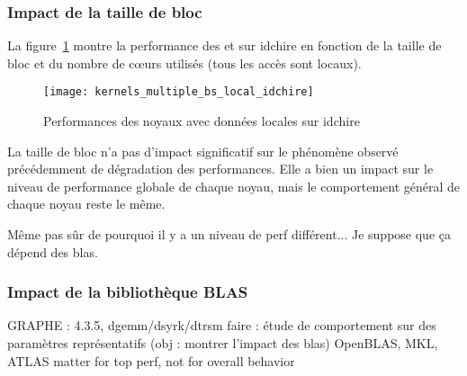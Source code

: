 


\subsubsection{Impact de la taille de bloc}

La figure~\ref{fig:contribs:apps:cholesky:perf-multiple-bs-idchire} montre la performance des \gemm et \potrf sur idchire en fonction de la taille de bloc et du nombre de cœurs utilisés (tous les accès sont locaux).

\begin{figure}[ht]
  \centering
  \texttt{[image: kernels\_multiple\_bs\_local\_idchire]}
  \caption{Performances des noyaux avec données locales sur idchire}\label{fig:contribs:apps:cholesky:perf-multiple-bs-idchire}
\end{figure}

La taille de bloc n'a pas d'impact significatif sur le phénomène observé précédemment de dégradation des performances.
Elle a bien un impact sur le niveau de performance globale de chaque noyau, mais le comportement général de chaque noyau reste le même.


\begin{todo}
  Même pas sûr de pourquoi il y a un niveau de perf différent... Je suppose que ça dépend des blas.
\end{todo}



\subsubsection{Impact de la bibliothèque BLAS}

GRAPHE : 4.3.5, dgemm/dsyrk/dtrsm faire : étude de comportement sur des paramètres représentatifs (obj : montrer l'impact des blas)
OpenBLAS, MKL, ATLAS
matter for top perf, not for overall behavior

